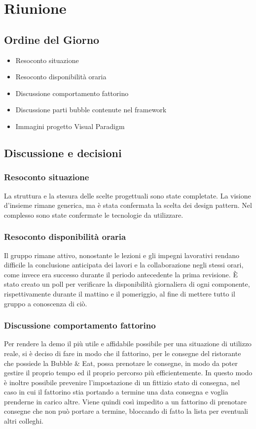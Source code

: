 \section{Riunione}
\subsection{Ordine del Giorno}
\begin{itemize}
	\item Resoconto situazione
	\item Resoconto disponibilità oraria
	\item Discussione comportamento fattorino
	\item Discussione parti bubble contenute nel framework 
	\item Immagini progetto Visual Paradigm
\end{itemize}

\subsection{Discussione e decisioni}

\subsubsection{Resoconto situazione}
La struttura e la stesura delle scelte progettuali sono state completate. La visione d'insieme rimane generica, ma è stata confermata la scelta dei design pattern. Nel complesso sono state confermate le tecnologie da utilizzare.

\subsubsection{Resoconto disponibilità oraria}
Il gruppo rimane attivo, nonostante le lezioni e gli impegni lavorativi rendano difficile la conclusione anticipata dei lavori e la collaborazione negli stessi orari, come invece era successo durante il periodo antecedente la prima revisione. È stato creato un poll per verificare la disponibilità giornaliera di ogni componente, rispettivamente durante il mattino e il pomeriggio, al fine di mettere tutto il gruppo a conoscenza di ciò.

\subsubsection{Discussione comportamento fattorino}
Per rendere la demo il più utile e affidabile possibile per una situazione di utilizzo reale, si è deciso di fare in modo che il fattorino, per le consegne del ristorante che possiede la Bubble \& Eat, possa prenotare le consegne, in modo da poter gestire il proprio tempo ed il proprio percorso più efficientemente. In questo modo è inoltre possibile prevenire l'impostazione di un fittizio stato di consegna, nel caso in cui il fattorino stia portando a termine una data consegna e voglia prenderne in carico altre. Viene quindi così impedito a un fattorino di prenotare consegne che non può portare a termine, bloccando di fatto la lista per eventuali altri colleghi.

